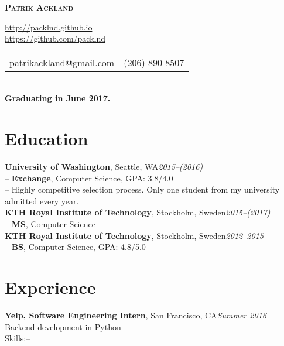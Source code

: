 \documentclass[10pt]{article}
\begin{document}

\centerline{\LARGE \textbf{\textsc{Patrik Ackland}}}

\begin{center}
  \url{http://packlnd.github.io}\\
  \vspace{0.3em}
  \url{https://github.com/packlnd}\\
  \vspace{0.3em}
  \begin{tabular}{l r}
    patrikackland@gmail.com&(206) 890-8507
  \end{tabular} \\
  \vspace{0.3em}
  \textbf{Graduating in June 2017.}
\end{center}

\section*{Education}
\vspace{0.1em}
\hline
\vspace{0.3em}
\noindent\textbf{University of Washington}, Seattle, WA\hfill\textit{2015--(2016)}\\
\indent-- \textbf{Exchange}, Computer Science, GPA: 3.8/4.0\\
\indent-- Highly competitive selection process. Only one student from my university admitted every year.\\

\noindent\textbf{KTH Royal Institute of Technology}, Stockholm, Sweden\hfill\textit{2015--(2017)}\\
\indent-- \textbf{MS}, Computer Science\\

\noindent\textbf{KTH Royal Institute of Technology}, Stockholm, Sweden\hfill\textit{2012--2015}\\
\indent-- \textbf{BS}, Computer Science, GPA: 4.8/5.0\\

\section*{Experience}
\vspace{0.1em}
\hline
\vspace{0.3em}
\noindent\textbf{Yelp, Software Engineering Intern}, San Francisco, CA\hfill\textit{Summer 2016}\\
\indent Backend development in Python \\
\indent Skills:--\\
\end{document}
